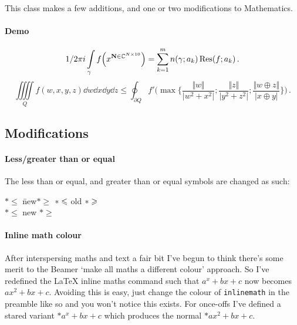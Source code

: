 \documentclass[solid,math,chem,code,plot,gloss]{bmc}
\begin{document}
This class makes a few additions, and one or two modifications to Mathematics.

\paragraph{Demo}
\[
    \frac{1}{2\pi i} \int\limits_\gamma f\Bigl(x^{\mathbf{N}\in\mathbb{C}^{N\times 10}}\Bigr)
    = \sum_{k=1}^m n(\gamma;a_k) \operatorname{Res} (f;a_k)\,.
\]
\[
  \iiiint\limits_{Q}f(w,x,y,z) \dd w \dd x \dd y \dd z
  \leq
  \oint_{\partial Q} f'\Biggl(\max\Biggl\{
  \frac{\Vert w\Vert}{\vert w^2+x^2\vert};
  \frac{\Vert z\Vert}{\vert y^2+z^2\vert};
  \frac{\Vert w\oplus z\Vert}{\vert x\oplus y\vert}
  \Biggr\}\Biggr)\,.
\]

\subsection{Modifications}

\paragraph{Less/greater than or equal}
The less than or equal, and greater than or equal symbols are changed as such:
\vspace{-6pt}
\begin{center}
    \parbox{0cm}{
    \begin{tabbing}
        \(*\leq \) \quad \= new\quad \= \(*\geq \) \kill
        \(*\oldleq \) \> old \> \(*\oldgeq \) \\
        \(*\leq \) \> new \> \(*\geq \)
    \end{tabbing}}
\end{center}

\paragraph{Inline math colour}
After interspersing maths and text a fair bit I've begun to think there's some
merit to the Beamer `make all maths a different colour' approach.
So I've redefined the LaTeX inline maths command such that
\texttt{\(a^x + bx + c\)} now becomes \(ax^2 + bx + c\).
Avoiding this is easy, just change the colour of \texttt{inlinemath}
in the preamble like so \texttt{}
 and you won't notice this exists.
For once-offs I've defined a stared variant \texttt{\(* a^x + bx + c\)}
which produces the normal \(*ax^2 + bx + c\).
\end{document}
